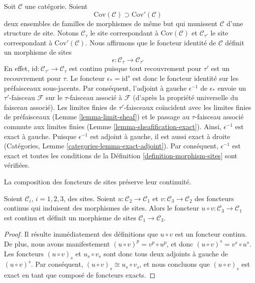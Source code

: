\begin{example}
\label{example-finer-topology}
Soit $\mathcal{C}$ une catégorie. Soient
$$
\text{Cov}(\mathcal{C}) \supset \text{Cov}'(\mathcal{C})
$$
deux ensembles de familles de morphismes de même but
qui munissent $\mathcal{C}$ d’une structure de site. Notons $\mathcal{C}_\tau$
le site correspondant à $\text{Cov}(\mathcal{C})$ et
$\mathcal{C}_{\tau'}$ le site correspondant à $\text{Cov}'(\mathcal{C})$.
Nous affirmons que le foncteur identité de $\mathcal{C}$ définit un morphisme de sites
$$
\epsilon : \mathcal{C}_\tau \longrightarrow \mathcal{C}_{\tau'}
$$
En effet, $\text{id} : \mathcal{C}_{\tau'} \to \mathcal{C}_\tau$
est continu puisque tout recouvrement pour $\tau'$ est un recouvrement pour $\tau$.
Le foncteur $\epsilon_* = \text{id}^s$ est donc le foncteur identité sur les
préfaisceaux sous-jacents. Par conséquent, l’adjoint à gauche $\epsilon^{-1}$
de $\epsilon_*$ envoie un $\tau'$-faisceau $\mathcal{F}$ sur le
$\tau$-faisceau associé à $\mathcal{F}$ (d’après la
propriété universelle du faisceau associé).
Les limites finies de $\tau'$-faisceaux coïncident avec les limites finies
de préfaisceaux (Lemme \ref{lemma-limit-sheaf}) et le passage au
$\tau$-faisceau associé commute aux limites finies
(Lemme \ref{lemma-sheafification-exact}).
Ainsi, $\epsilon^{-1}$ est exact à gauche. Puisque $\epsilon^{-1}$
est adjoint à gauche, il est aussi exact à droite
(Catégories, Lemme \ref{categories-lemma-exact-adjoint}).
Par conséquent, $\epsilon^{-1}$ est exact et toutes les
conditions de la Définition \ref{definition-morphism-sites} sont vérifiées.
\end{example}

\begin{lemma}
\label{lemma-composition-morphisms-sites}
\begin{slogan}
La composition des foncteurs de sites préserve leur continuité.
\end{slogan}
Soient $\mathcal{C}_i$, $i = 1, 2, 3$, des sites. Soient
$u : \mathcal{C}_2 \to \mathcal{C}_1$ et
$v : \mathcal{C}_3 \to \mathcal{C}_2$ des foncteurs continus
qui induisent des morphismes de sites. Alors le foncteur
$u \circ v : \mathcal{C}_3 \to \mathcal{C}_1$ est continu et
définit un morphisme de sites $\mathcal{C}_1 \to \mathcal{C}_3$.
\end{lemma}

\begin{proof}
Il résulte immédiatement des définitions que $u \circ v$ est un foncteur continu.
De plus, nous avons manifestement $(u \circ v)^p = v^p \circ u^p$, et donc
$(u \circ v)^s = v^s \circ u^s$. Les foncteurs $(u \circ v)_s$ et
$u_s \circ v_s$ sont donc tous deux adjoints à gauche de $(u \circ v)^s$. Par conséquent,
$(u \circ v)_s \cong u_s \circ v_s$, et nous concluons que $(u \circ v)_s$
est exact en tant que composé de foncteurs exacts.
\end{proof}


